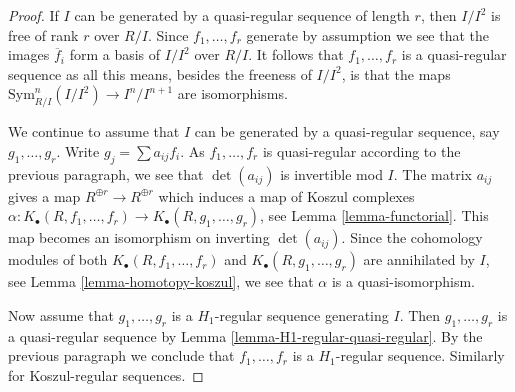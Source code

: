\documentclass[10pt,a4paper]{amsart}
\theoremstyle{plain}
\theoremstyle{definition}
\theoremstyle{remark}
\numberwithin{equation}{subsection}
\begin{document}
\begin{proof}
If $I$ can be generated by a quasi-regular sequence of length $r$,
then $I/I^2$ is free of rank $r$ over $R/I$. Since $f_1, \ldots, f_r$
generate by assumption we see that the images $\overline{f}_i$ form a basis of
$I/I^2$ over $R/I$. It follows that $f_1, \ldots, f_r$ is a quasi-regular
sequence as all this means, besides the freeness of $I/I^2$, is that the maps
$\text{Sym}^n_{R/I}(I/I^2) \to I^n/I^{n + 1}$ are isomorphisms.

\medskip\noindent
We continue to assume that $I$ can be generated by a
quasi-regular sequence, say
$g_1, \ldots, g_r$. Write $g_j = \sum a_{ij}f_i$. As $f_1, \ldots, f_r$
is quasi-regular according to the previous paragraph, we see that
$\det(a_{ij})$ is invertible mod $I$. The matrix
$a_{ij}$ gives a map $R^{\oplus r} \to R^{\oplus r}$ which induces
a map of Koszul complexes
$\alpha : K_\bullet(R, f_1, \ldots, f_r) \to K_\bullet(R, g_1, \ldots, g_r)$,
see
Lemma \ref{lemma-functorial}.
This map becomes an isomorphism on inverting $\det(a_{ij})$.
Since the cohomology modules of both $K_\bullet(R, f_1, \ldots, f_r)$ and
$K_\bullet(R, g_1, \ldots, g_r)$ are annihilated by $I$, see
Lemma \ref{lemma-homotopy-koszul},
we see that $\alpha$ is a quasi-isomorphism.

\medskip\noindent
Now assume that $g_1, \ldots, g_r$ is a $H_1$-regular sequence generating $I$.
Then $g_1, \ldots, g_r$ is a quasi-regular sequence by
Lemma \ref{lemma-H1-regular-quasi-regular}. By the previous paragraph
we conclude that $f_1, \ldots, f_r$ is a $H_1$-regular sequence.
Similarly for Koszul-regular sequences.
\end{proof}
\end{document}
